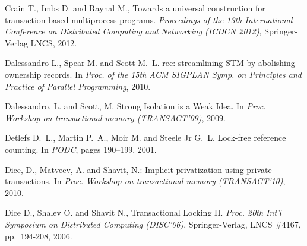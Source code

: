 \begin{thebibliography}{99}
{
Crain T., Imbs D. and Raynal M.,
Towards a universal construction for transaction-based multiprocess programs.
{\it Proceedings of the 13th International Conference on Distributed Computing and Networking (ICDCN 2012)}, 
Springer-Verlag LNCS, 2012.




Dalessandro L., Spear M. and Scott M.~L.
rec: streamlining {STM} by abolishing ownership records.
\newblock In {\em Proc. of the 15th ACM SIGPLAN Symp. on Principles and
  Practice of Parallel Programming}, 2010.





Dalessandro, L. and Scott, M.
\newblock Strong Isolation is a Weak Idea. 
\newblock In {\it Proc. Workshop on transactional memory (TRANSACT'09)}, 2009.




Detlefs D.~L., Martin P.~A., Moir M. and Steele Jr G.~L.
\newblock Lock-free reference counting.
\newblock In {\em PODC}, pages 190--199, 2001.


Dice, D., Matveev, A. and  Shavit, N.:
\newblock Implicit privatization using private transactions. 
\newblock In {\em Proc. Workshop on transactional memory (TRANSACT'10)}, 2010.


Dice D., Shalev O. and Shavit N.,
Transactional Locking II.
{\em Proc. 20th Int'l Symposium on Distributed Computing (DISC'06)},
Springer-Verlag, LNCS \#4167, pp.~194-208, 2006.

% 
% 
% 
% 




}
\end{thebibliography}
